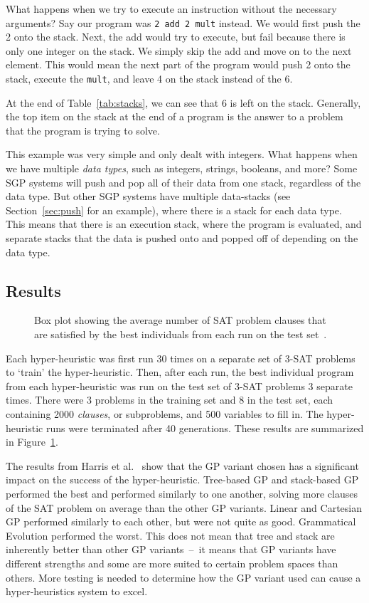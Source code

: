\documentclass{sig-alternate}
\begin{document}
What happens when we try to execute an instruction without the necessary arguments? Say our program was \texttt{2~add~2~mult} instead. We would first push the 2 onto the stack. Next, the add would try to execute, but fail because there is only one integer on the stack. We simply skip the add and move on to the next element. This would mean the next part of the program would push 2 onto the stack, execute the \texttt{mult}, and leave 4 on the stack instead of the 6.

At the end of Table~\ref{tab:stacks}, we can see that 6 is left on the stack. Generally, the top item on the stack at the end of a program is the answer to a problem that the program is trying to solve.

This example was very simple and only dealt with integers. What happens when we have multiple \textit{data types}, such as integers, strings, booleans, and more? Some SGP systems will push and pop all of their data from one stack, regardless of the data type. But other SGP systems have multiple data-stacks (see Section~\ref{sec:push} for an example), where there is a stack for each data type. This means that there is an execution stack, where the program is evaluated, and separate stacks that the data is pushed onto and popped off of depending on the data type.

\subsection{Results}
\label{sec:gpresults}
\begin{figure}
	\centering
	\caption{Box plot showing the average number of SAT problem clauses that are satisfied by the best individuals from each run on the test set~\cite{harris:2015}.}
	\label{fig:gpvariants}
\end{figure}
Each hyper-heuristic was first run 30 times on a separate set of 3-SAT problems to `train' the hyper-heuristic. Then, after each run, the best individual program from each hyper-heuristic was run on the test set of 3-SAT problems 3 separate times. There were 3 problems in the training set and 8 in the test set, each containing 2000 \textit{clauses}, or subproblems, and 500 variables to fill in. The hyper-heuristic runs were terminated after 40 generations. These results are summarized in Figure~\ref{fig:gpvariants}.

The results from Harris et al.~\cite{harris:2015} show that the GP variant chosen has a significant impact on the success of the hyper-heuristic. Tree-based GP and stack-based GP performed the best and performed similarly to one another, solving more clauses of the SAT problem on average than the other GP variants. Linear and Cartesian GP performed similarly to each other, but were not quite as good. Grammatical Evolution performed the worst. This does not mean that tree and stack are inherently better than other GP variants~--~it means that GP variants have different strengths and some are more suited to certain problem spaces than others. More testing is needed to determine how the GP variant used can cause a hyper-heuristics system to excel.
\end{document}

